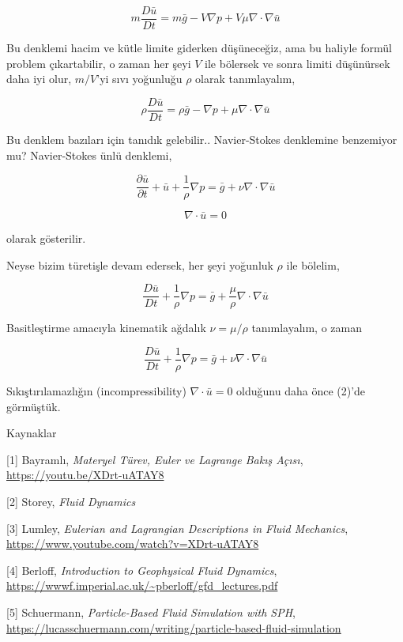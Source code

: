 \documentclass[12pt,fleqn]{article}\usepackage{../../common}
\begin{document}
$$
m \frac{D \bar{u}}{D t} = m\bar{g} - V \nabla p + V \mu \nabla \cdot \nabla \bar{u}
$$

Bu denklemi hacim ve kütle limite giderken düşüneceğiz, ama bu haliyle formül
problem çıkartabilir, o zaman her şeyi $V$ ile bölersek ve sonra limiti
düşünürsek daha iyi olur, $m/V$'yi sıvı yoğunluğu $\rho$ olarak tanımlayalım,

$$
\rho \frac{D \bar{u}}{D t} = \rho \bar{g} -
\nabla p +
\mu \nabla \cdot \nabla \bar{u}
$$

Bu denklem bazıları için tanıdık gelebilir.. Navier-Stokes denklemine benzemiyor
mu? Navier-Stokes ünlü denklemi,

$$
\frac{\partial \bar{u}}{\partial t} + \bar{u} + \frac{1}{\rho} \nabla p =
\bar{g} + \nu \nabla \cdot \nabla \bar{u}
$$

$$
\nabla \cdot \bar{u} = 0
$$

olarak gösterilir.

Neyse bizim türetişle devam edersek, her şeyi yoğunluk $\rho$ ile bölelim,

$$
\frac{D \bar{u}}{D t} + \frac{1}{\rho} \nabla p =
\bar{g}  + \frac{\mu}{\rho} \nabla \cdot \nabla \bar{u}
$$

Basitleştirme amacıyla kinematik ağdalık $\nu = \mu / \rho$ tanımlayalım, o
zaman 

$$
\frac{D \bar{u}}{D t} + \frac{1}{\rho} \nabla p =
\bar{g}  + \nu \nabla \cdot \nabla \bar{u}
$$

Sıkıştırılamazlığın (incompressibility) $\nabla \cdot \bar{u} = 0$ olduğunu daha
önce (2)'de görmüştük.

Kaynaklar

[1] Bayramlı, {\em Materyel Türev, Euler ve Lagrange Bakış Açısı},
    \url{https://youtu.be/XDrt-uATAY8}

[2] Storey, {\em Fluid Dynamics}

[3] Lumley, {\em Eulerian and Lagrangian Descriptions in Fluid Mechanics},
    \url{https://www.youtube.com/watch?v=XDrt-uATAY8}

[4] Berloff, {\em Introduction to Geophysical Fluid Dynamics},
    \url{https://wwwf.imperial.ac.uk/~pberloff/gfd_lectures.pdf}

[5] Schuermann, {\em Particle-Based Fluid Simulation with SPH},
    \url{https://lucasschuermann.com/writing/particle-based-fluid-simulation}
    
          
\end{document}
